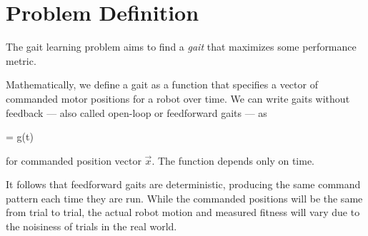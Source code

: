 \section{Problem Definition}

%
%
%
%
%


The gait learning problem aims to find a \emph{gait} that maximizes
some performance metric.

Mathematically, we define a gait as a function that specifies
a vector of commanded motor positions for a robot over time.
We can write gaits without feedback --- also called open-loop or
feedforward gaits --- as

\be
{} = g(t)
\ee

\noindent for commanded position vector $\vec{x}$.  The
function depends only on time.

%
%

It follows that feedforward gaits are deterministic, producing the
same command pattern each time they are run.  While the commanded
positions will be the same from trial to trial, the actual robot
motion and measured fitness will vary due to the noisiness of trials
in the real world.

